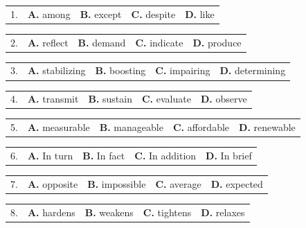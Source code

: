 \documentclass[UTF8,11pt]{ctexart}
\begin{document}
\noindent\begin{tabularx}{\linewidth}{@{}lXXXX@{}}1. & \textbf{A.} among & \textbf{B.} except & \textbf{C.} despite & \textbf{D.} like\\\end{tabularx}\par

\noindent\begin{tabularx}{\linewidth}{@{}lXXXX@{}}2. & \textbf{A.} reflect & \textbf{B.} demand & \textbf{C.} indicate & \textbf{D.} produce\\\end{tabularx}\par

\noindent\begin{tabularx}{\linewidth}{@{}lXXXX@{}}3. & \textbf{A.} stabilizing & \textbf{B.} boosting & \textbf{C.} impairing & \textbf{D.} determining\\\end{tabularx}\par

\noindent\begin{tabularx}{\linewidth}{@{}lXXXX@{}}4. & \textbf{A.} transmit & \textbf{B.} sustain & \textbf{C.} evaluate & \textbf{D.} observe\\\end{tabularx}\par

\noindent\begin{tabularx}{\linewidth}{@{}lXXXX@{}}5. & \textbf{A.} measurable & \textbf{B.} manageable & \textbf{C.} affordable & \textbf{D.} renewable\\\end{tabularx}\par

\noindent\begin{tabularx}{\linewidth}{@{}lXXXX@{}}6. & \textbf{A.} In turn & \textbf{B.} In fact & \textbf{C.} In addition & \textbf{D.} In brief\\\end{tabularx}\par

\noindent\begin{tabularx}{\linewidth}{@{}lXXXX@{}}7. & \textbf{A.} opposite & \textbf{B.} impossible & \textbf{C.} average & \textbf{D.} expected\\\end{tabularx}\par

\noindent\begin{tabularx}{\linewidth}{@{}lXXXX@{}}8. & \textbf{A.} hardens & \textbf{B.} weakens & \textbf{C.} tightens & \textbf{D.} relaxes\\\end{tabularx}\par
\end{document}
